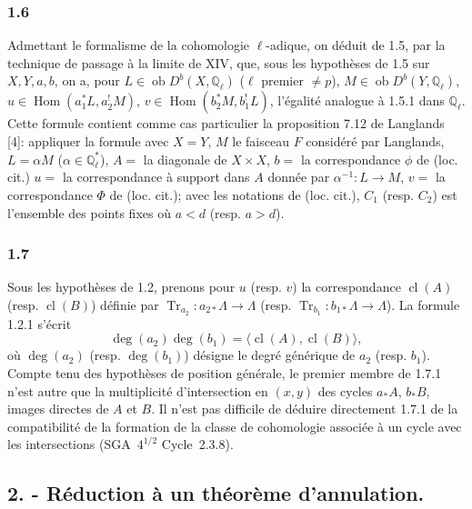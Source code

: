 \documentclass[11pt]{article}
\DeclareMathOperator{\Hom}{Hom}
\newcommand{\ob}{\operatorname{ob}}
\providecommand{\cl}{\operatorname{cl}}
\providecommand{\Tr}{\operatorname{Tr}}
\providecommand{\Tr}{\operatorname{Tr}}
\providecommand{\Tr}{\operatorname{Tr}}
\providecommand{\Hom}{\operatorname{Hom}}
\providecommand{\ob}{\operatorname{ob}}
\providecommand{\Tr}{\operatorname{Tr}}
\providecommand{\cl}{\operatorname{cl}}
\providecommand{\Hom}{\operatorname{Hom}}
\providecommand{\cl}{\operatorname{cl}}
\providecommand{\Tr}{\operatorname{Tr}}
\begin{document}
\subsubsection*{1.6}
Admettant le formalisme de la cohomologie $\ell$-adique, on déduit de 1.5, par la technique de passage à la limite de XIV, que, sous les hypothèses de 1.5 sur $X,Y,a,b$, on a, pour $L\in\ob D^b(X,\mathbb Q_\ell)$ ($\ell$ premier $\ne p$), $M\in\ob D^b(Y,\mathbb Q_\ell)$, $u\in\Hom(a_1^*L,a_2^!M)$, $v\in\Hom(b_2^*M,b_1^!L)$, l'égalité analogue à 1.5.1 dans $\mathbb Q_\ell$. Cette formule contient comme cas particulier la proposition 7.12 de Langlands [4]: appliquer la formule avec $X=Y$, $M$ le faisceau $F$ considéré par Langlands, $L=\alpha M$ ($\alpha\in\mathbb Q_\ell^*$), $A=$ la diagonale de $X\times X$, $b=$ la correspondance $\phi$ de (loc. cit.) 
$u=$ la
correspondance à support dans $A$ donnée par $\alpha^{-1}:L\to M$, $v=$ la correspondance $\Phi$ de (loc. cit.); avec les notations de (loc. cit.), $C_1$ (resp. $C_2$) est l'ensemble des points fixes où $a<d$ (resp. $a>d$).

\subsubsection*{1.7}
Sous les hypothèses de 1.2, prenons pour $u$ (resp. $v$) la correspondance $\cl(A)$ (resp. $\cl(B)$) définie par $\Tr_{a_2}:a_{2*}\Lambda\to\Lambda$ (resp. $\Tr_{b_1}:b_{1*}\Lambda\to\Lambda$). La formule 1.2.1 s'écrit
\begin{equation}\tag{1.7.1}
\deg(a_2)\deg(b_1)=\langle \cl(A),\cl(B)\rangle,
\end{equation}
où $\deg(a_2)$ (resp. $\deg(b_1)$) désigne le degré générique de $a_2$ (resp. $b_1$). Compte tenu des hypothèses de position générale, le premier membre de 1.7.1 n'est autre que la multiplicité d'intersection en $(x,y)$ des cycles $a_*A$, $b_*B$, images directes de $A$ et $B$. Il n'est pas difficile de déduire directement 1.7.1 de la compatibilité de la formation de la classe de cohomologie associée à un cycle avec les intersections (SGA~$4^{1/2}$ Cycle~2.3.8).


\subsection*{2. - Réduction à un théorème d'annulation.}
\end{document}
